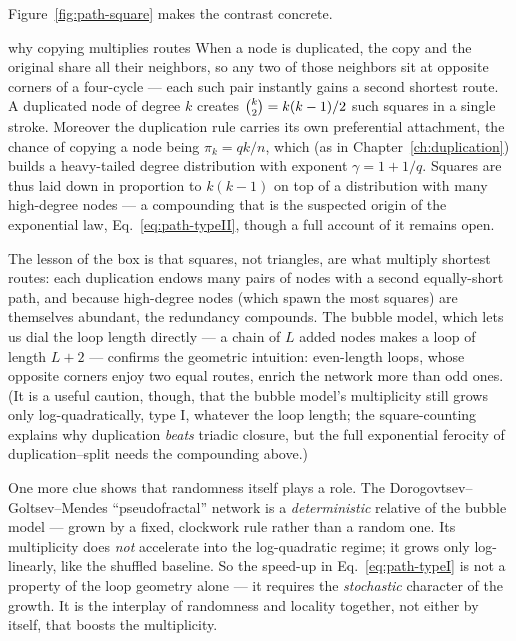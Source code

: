 Figure~\ref{fig:path-square} makes the contrast concrete.

\begin{calculation}{why copying multiplies routes}
When a node is duplicated, the copy and the original share all their neighbors,
so any two of those neighbors sit at opposite corners of a four-cycle --- each
such pair instantly gains a second shortest route. A duplicated node of degree
$k$ creates $\tbinom{k}{2}=k(k-1)/2$ such squares in a single stroke. Moreover the
duplication rule carries its own preferential attachment, the chance of copying a
node being $\pi_k = qk/n$, which (as in Chapter~\ref{ch:duplication}) builds a
heavy-tailed degree distribution with exponent $\gamma = 1+1/q$. Squares are thus
laid down in proportion to $k(k-1)$ on top of a distribution with many
high-degree nodes --- a compounding that is the suspected origin of the
exponential law, Eq.~\eqref{eq:path-typeII}, though a full account of it remains
open.
\end{calculation}

The lesson of the box is that squares, not triangles, are what multiply shortest
routes: each duplication endows many pairs of nodes with a second equally-short
path, and because high-degree nodes (which spawn the most squares) are themselves
abundant, the redundancy compounds. The bubble model, which lets us dial the loop
length directly --- a chain of $L$ added nodes makes a loop of length $L+2$ ---
confirms the geometric intuition: even-length loops, whose opposite corners enjoy
two equal routes, enrich the network more than odd ones. (It is a useful caution,
though, that the bubble model's multiplicity still grows only log-quadratically,
type I, whatever the loop length; the square-counting explains why duplication
\emph{beats} triadic closure, but the full exponential ferocity of
duplication--split needs the compounding above.)

One more clue shows that randomness itself plays a role. The
Dorogovtsev--Goltsev--Mendes ``pseudofractal'' network
\citep{dorogovtsevgoltsev2002} is a \emph{deterministic} relative of the bubble
model --- grown by a fixed, clockwork rule rather than a random one. Its
multiplicity does \emph{not} accelerate into the log-quadratic regime; it grows
only log-linearly, like the shuffled baseline. So the speed-up in
Eq.~\eqref{eq:path-typeI} is not a property of the loop geometry alone --- it
requires the \emph{stochastic} character of the growth. It is the interplay of
randomness and locality together, not either by itself, that boosts the
multiplicity.

